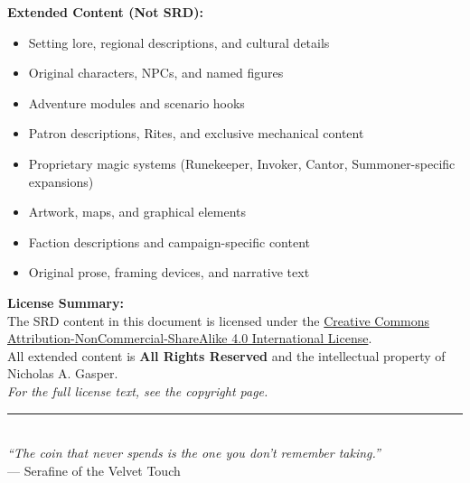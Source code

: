 \begin{center}
\begin{minipage}{0.85\textwidth}
    \textbf{Extended Content (Not SRD):}
    \begin{itemize}
      \item Setting lore, regional descriptions, and cultural details
      \item Original characters, NPCs, and named figures
      \item Adventure modules and scenario hooks
      \item Patron descriptions, Rites, and exclusive mechanical content
      \item Proprietary magic systems (Runekeeper, Invoker, Cantor, Summoner-specific expansions)
      \item Artwork, maps, and graphical elements
      \item Faction descriptions and campaign-specific content
      \item Original prose, framing devices, and narrative text
    \end{itemize}

    \vspace{0.2in}

    \textbf{License Summary:}\\[0.1in]
    The SRD content in this document is licensed under the
    \href{http://creativecommons.org/licenses/by-nc-sa/4.0/}{Creative Commons Attribution-NonCommercial-ShareAlike 4.0 International License}.\\[0.1in]
    All extended content is \textbf{All Rights Reserved} and the intellectual property of Nicholas A. Gasper.\\[0.2in]

    \textit{For the full license text, see the copyright page.}
  \end{minipage}

  \vspace{0.3in}
  \rule{0.5\textwidth}{0.4pt}\\[0.2in]
  \textit{``The coin that never spends is the one you don't remember taking.''}\\[0.1in]
  --- Serafine of the Velvet Touch
\end{center}
\cleardoublepage